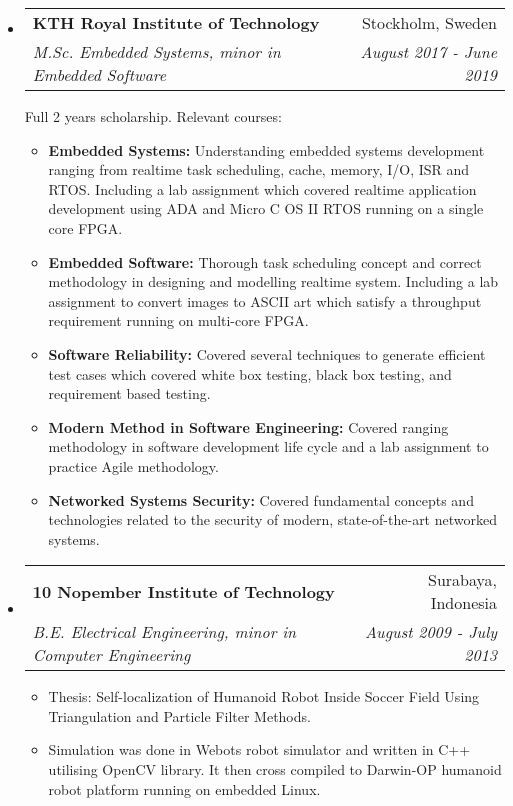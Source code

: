 \documentclass[letterpaper,10pt]{article}
\makeatletter
\newlength{\outerbordwidth}
\newcommand{\resitem}[1]{\item #1 \vspace{-2pt}}
\newcommand{\resheading}[1]{\vspace{8pt}
  \parbox{\textwidth}{\setlength{\FrameSep}{\outerbordwidth}
    \begin{shaded}

\setlength{\fboxsep}{0pt}\framebox[\textwidth][l]{\setlength{\fboxsep}{4pt}\fcolorbox{shadecolorB}{shadecolorB}{\textbf{\sffamily{\mbox{~}\makebox[6.762in][l]{\large #1} \vphantom{p\^{E}}}}}}
    \end{shaded}
  }\vspace{-5pt}
}
\newcommand{\ressubheading}[4]{
\begin{tabular*}{6.5in}{l@{\cftdotfill{\cftsecdotsep}\extracolsep{\fill}}r}
		\textbf{#1} & #2 \\
        \textit{#3} & \textit{#4} \\
\end{tabular*}\vspace{-6pt}}
\newcommand{\ressubheadingwithtext}[4]{
\begin{tabular*}{6.5in}{l@{\cftdotfill{\cftsecdotsep}\extracolsep{\fill}}r}
		\textbf{#1} & #2 \\
        \textit{#3} & \textit{#4} \\
\end{tabular*}\vspace{2pt}}
\newcommand{\ressubheadingtext}[1]{
    \textnormal{#1}\vspace{-6pt}
}
\makeatother
\begin{document}
\begin{itemize}

\item
    \ressubheadingwithtext{KTH Royal Institute of Technology}{Stockholm, Sweden}{M.Sc. Embedded Systems, minor in Embedded Software}{August 2017 - June 2019}
    \ressubheadingtext{Full 2 years scholarship. Relevant courses: }
    \begin{itemize}
		\resitem{\textbf{Embedded Systems: }Understanding embedded systems development ranging from realtime task scheduling, cache, memory, I/O, ISR and RTOS. Including a lab assignment which covered realtime application development using ADA and Micro C OS II RTOS running on a single core FPGA.}
        \resitem{\textbf{Embedded Software: }Thorough task scheduling concept and correct methodology in designing and modelling realtime system. Including a lab assignment to convert images to ASCII art which satisfy a throughput requirement running on multi-core FPGA.}
        \resitem{\textbf{Software Reliability: }Covered several techniques to generate efficient test cases which covered white box testing, black box testing, and requirement based testing.}
        \resitem{\textbf{Modern Method in Software Engineering: }Covered ranging methodology in software development life cycle and a lab assignment to practice Agile methodology.}
        \resitem{\textbf{Networked Systems Security: }Covered fundamental concepts and technologies related to the security of modern, state-of-the-art networked systems.}
	\end{itemize} 

\item
	\ressubheading{10 Nopember Institute of Technology}{Surabaya, Indonesia}{B.E. Electrical Engineering, minor in Computer Engineering}{August 2009 - July 2013}
	\begin{itemize}
    \resitem{ Thesis: Self-localization of Humanoid Robot Inside Soccer Field Using Triangulation and Particle Filter Methods.}
    \resitem{Simulation was done in Webots robot simulator and written in C++ utilising OpenCV library. It then cross compiled to Darwin-OP humanoid robot platform running on embedded Linux.}
	\end{itemize}

\end{itemize}


\resheading{Skills}

\end{document}
